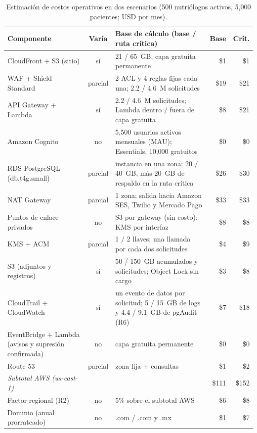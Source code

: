 \documentclass[12pt, a4paper]{article}
\begin{document}
\begin{table}[!htbp]
  \centering
  \caption{Estimación de costos operativos en dos escenarios (500 nutriólogos
  activos, 5,000 pacientes; USD por mes).}
  \label{tab:costos}
  \scriptsize
  \setlength{\tabcolsep}{3pt}
  \renewcommand{\arraystretch}{1.05}
  \begin{tabularx}{\textwidth}{p{3.4cm} c X r r}
    \toprule
    \textbf{Componente} & \textbf{Varía} & \textbf{Base de cálculo (base / ruta crítica)} & \textbf{Base} & \textbf{Crít.} \\
    \midrule
    CloudFront + S3 (sitio) & sí & 21 / 65~GB, capa gratuita permanente & \$1 & \$1 \\
    WAF + Shield Standard & parcial & 2 ACL y 4 reglas fijas cada una; 2.2 / 4.6~M solicitudes & \$19 & \$21 \\
    API Gateway + Lambda & sí & 2.2 / 4.6~M solicitudes; Lambda dentro / fuera de capa gratuita & \$8 & \$21 \\
    Amazon Cognito & no & 5,500 usuarios activos mensuales (MAU); Essentials, 10,000 gratuitos & \$0 & \$0 \\
    RDS PostgreSQL (db.t4g.small) & parcial & instancia en una zona; 20 / 40~GB, más 20~GB de respaldo en la ruta crítica & \$26 & \$30 \\
    NAT Gateway & parcial & 1 zona; salida hacia Amazon SES, Twilio y Mercado Pago & \$33 & \$33 \\
    Puntos de enlace privados & no & S3 por gateway (sin costo); KMS por interfaz & \$8 & \$8 \\
    KMS + ACM & parcial & 1 / 2 llaves; una llamada por cada dos solicitudes & \$4 & \$9 \\
    S3 (adjuntos y registros) & sí & 50 / 150~GB acumulados y solicitudes; Object Lock sin cargo & \$3 & \$8 \\
    CloudTrail + CloudWatch & sí & un evento de datos por solicitud; 5 / 15~GB de logs y 4.4 / 9.1~GB de pgAudit (R6) & \$7 & \$18 \\
    EventBridge + Lambda (avisos y supresión confirmada) & no & capa gratuita permanente & \$0 & \$0 \\
    Route 53 & parcial & zona fija + consultas & \$1 & \$2 \\
    \midrule
    \textit{Subtotal AWS (us-east-1)} & & & \$111 & \$152 \\
    Factor regional (R2) & no & 5\% sobre el subtotal AWS & \$6 & \$8 \\
    Dominio (anual prorrateado) & no & .com / .com y .mx & \$1 & \$7 \\

\end{tabularx}
\end{table}
\end{document}
